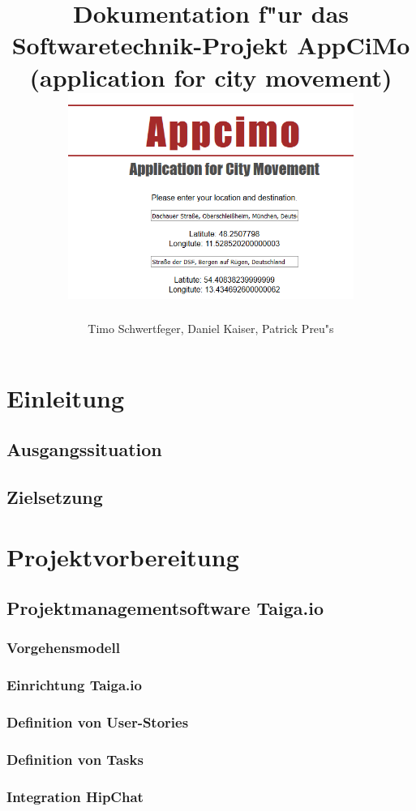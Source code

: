 \documentclass[a4paper, 11pt]{scrreprt}
\author{Timo Schwertfeger, Daniel Kaiser, Patrick Preu"s}
\title{Dokumentation f"ur das Softwaretechnik-Projekt AppCiMo (application for city movement) 
\newline
\newline
\includegraphics[width=0.7\textwidth]{appcimo.png}}
\begin{document}
\maketitle

\setcounter{secnumdepth}{5}
\setcounter{tocdepth}{5}

\tableofcontents


\chapter{Einleitung}

\section{Ausgangssituation}

\section{Zielsetzung}

\chapter{Projektvorbereitung}

\section{Projektmanagementsoftware Taiga.io}

\subsection{Vorgehensmodell}

\subsection{Einrichtung Taiga.io}

\subsection{Definition von User-Stories}

\subsection{Definition von Tasks}

\subsection{Integration HipChat}
\end{document}
